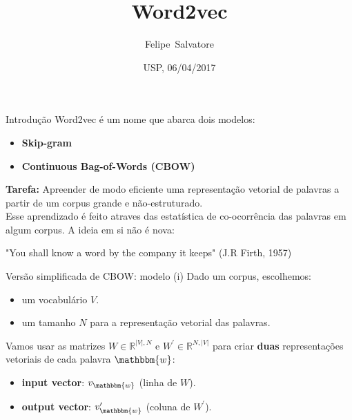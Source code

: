 \documentclass{beamer}
\title[Word2Vec] 
{Word2vec}
\author[F.Salvatore] 
{Felipe~Salvatore}
\date[USP 2015] 
{USP, 06/04/2017}
\newcommand{\wo}{\mathbbm{w}}
\begin{document}
\begin{frame}
\titlepage 
\end{frame}





\begin{frame}{Introdução}
Word2vec é um nome que abarca dois modelos:
\begin{itemize}
\item \textbf{Skip-gram}
\item \textbf{Continuous Bag-of-Words (CBOW)}
\end{itemize}

\vspace{0.1cm}
\textbf{Tarefa:} Apreender de modo eficiente uma representação vetorial de palavras a partir de um corpus grande e não-estruturado.\\

Esse aprendizado é feito atraves das estatística de co-ocorrência das palavras em algum corpus. A ideia em si não é nova:
\vspace{0.1cm}

\begin{center}
{\color{blue!89}"You shall know a word by the company it keeps" (J.R Firth, 1957)}
\end{center}
\end{frame}


\begin{frame}[fragile]{Versão simplificada de CBOW: modelo (i)}
Dado um corpus, escolhemos:
\begin{itemize}
\item um vocabulário $V$. 
\item um tamanho $N$ para a representação vetorial das palavras.
\end{itemize}
\vspace{0.1cm}
Vamos usar as matrizes $W \in \mathbb{R}^{|V|,N}$ e $W^{\prime} \in \mathbb{R}^{N,|V|}$ para criar \textbf{duas} representações vetoriais de cada palavra $\wo$:
\vspace{0.1cm}
\begin{itemize}
\item \textbf{input vector}: $v_\wo$  (linha de $W$).
\vspace{0.1cm}
\item \textbf{output vector}: $v^{\prime}_\wo$  (coluna de $W^{\prime}$).
\end{itemize}
\end{frame}
\end{document}
